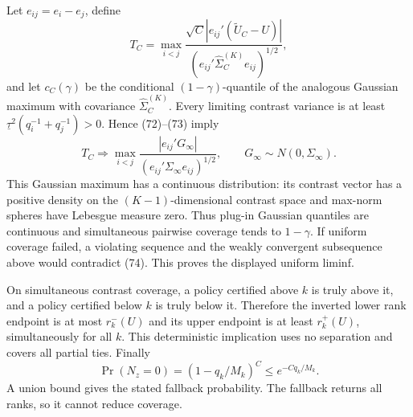 Let \(e_{ij}=e_i-e_j\), define
\[
T_C=\max_{i<j}\frac{\sqrt C|e_{ij}'(\widetilde U_C-U)|}
{(e_{ij}'\widehat\Sigma_C^{(K)}e_{ij})^{1/2}},
\]
and let \(c_C(\gamma)\) be the conditional \((1-\gamma)\)-quantile of the analogous Gaussian maximum with covariance \(\widehat\Sigma_C^{(K)}\).  Every limiting contrast variance is at least \(\underline\tau^2(q_i^{-1}+q_j^{-1})>0\).  Hence (72)--(73) imply
\[
T_C\Rightarrow\max_{i<j}\frac{|e_{ij}'G_\infty|}
{(e_{ij}'\Sigma_\infty e_{ij})^{1/2}},\qquad G_\infty\sim N(0,\Sigma_\infty). \tag{74}
\]
This Gaussian maximum has a continuous distribution: its contrast vector has a positive density on the \((K-1)\)-dimensional contrast space and max-norm spheres have Lebesgue measure zero.  Thus plug-in Gaussian quantiles are continuous and simultaneous pairwise coverage tends to \(1-\gamma\).  If uniform coverage failed, a violating sequence and the weakly convergent subsequence above would contradict (74).  This proves the displayed uniform liminf.

On simultaneous contrast coverage, a policy certified above \(k\) is truly above it, and a policy certified below \(k\) is truly below it.  Therefore the inverted lower rank endpoint is at most \(r_k^-(U)\) and its upper endpoint is at least \(r_k^+(U)\), simultaneously for all \(k\).  This deterministic implication uses no separation and covers all partial ties.  Finally
\[
\Pr(N_z=0)=(1-q_k/M_k)^C\leq e^{-Cq_k/M_k}.
\]
A union bound gives the stated fallback probability.  The fallback returns all ranks, so it cannot reduce coverage.